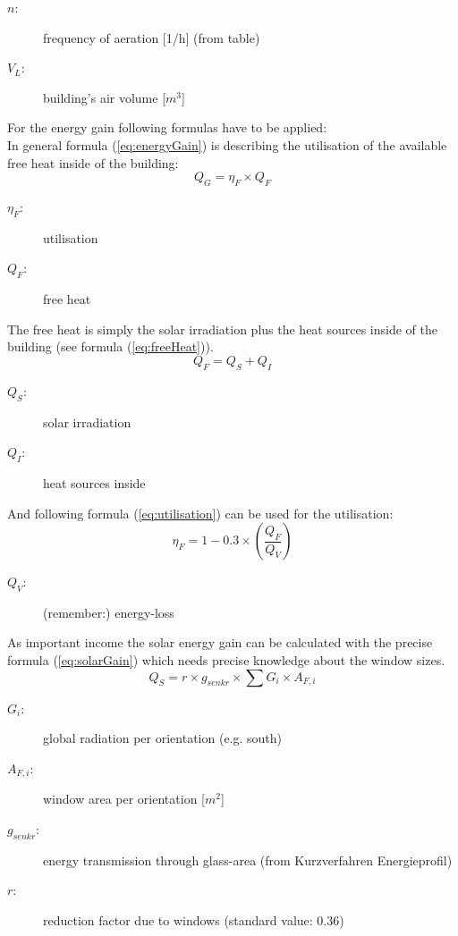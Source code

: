 \begin{description}
\item[$n$:] frequency of aeration [1/h] (from table)
\item[$V_L$:] building's air volume [$m^3$]
\end{description}
For the energy gain following formulas have to be applied:\\
In general formula (\ref{eq:energyGain}) is describing the utilisation of the available free heat inside of the building:
\begin{equation}
Q_G = \eta_F \times Q_F 
\label{eq:energyGain}
\end{equation}
\begin{description}
\item[$\eta_F$:] utilisation
\item[$Q_F$:] free heat
\end{description}
The free heat is simply the solar irradiation plus the heat sources inside of the building (see formula (\ref{eq:freeHeat})).
\begin{equation}
Q_F = Q_S + Q_I 
\label{eq:freeHeat}
\end{equation}
\begin{description}
\item[$Q_S $:] solar irradiation
\item[$Q_I $:] heat sources inside
\end{description}
And following formula (\ref{eq:utilisation}) can be used for the utilisation:
\begin{equation}
\eta_F = 1 - 0.3 \times (\dfrac{Q_F}{Q_V}) 
\label{eq:utilisation}
\end{equation}
\begin{description}
\item[$Q_V $:] (remember:) energy-loss
\end{description}
As important income the solar energy gain can be calculated with the precise formula (\ref{eq:solarGain}) which needs precise knowledge about the window sizes.
\begin{equation}
Q_S = r \times g_{senkr} \times \sum G_i \times A_{F,i} 
\label{eq:solarGain}
\end{equation}
\begin{description}
\item[$G_i $:] global radiation per orientation (e.g. south)
\item[$A_{F,i} $:] window area per orientation [$m^2$]
\item[$g_{senkr} $:] energy transmission through glass-area (from Kurzverfahren Energieprofil)
\item[$r $:] reduction factor due to windows (standard value: 0.36)
\end{description}
